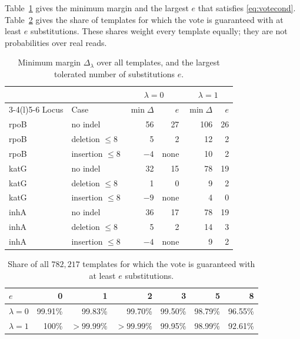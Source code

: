 \documentclass[11pt]{article}
\theoremstyle{plain}
\theoremstyle{definition}
\theoremstyle{remark}
\begin{document}
Table~\ref{tab:margins} gives the minimum margin and the largest $e$ that
satisfies \eqref{eq:votecond}. Table~\ref{tab:shares} gives the share of
templates for which the vote is guaranteed with at least $e$ substitutions.
These shares weight every template equally; they are not probabilities over real
reads.

\begin{table}[ht]
\centering
\caption{Minimum margin $\Delta_\lambda$ over all templates, and the largest
tolerated number of substitutions $e$.}\label{tab:margins}
\begin{tabular}{@{}llrrrr@{}}
\toprule
 & & \multicolumn{2}{c}{$\lambda = 0$} & \multicolumn{2}{c}{$\lambda = 1$} \\
\cmidrule(lr){3-4}\cmidrule(l){5-6}
Locus & Case & $\min\Delta$ & $e$ & $\min\Delta$ & $e$ \\
\midrule
rpoB & no indel            & 56   & 27   & 106 & 26 \\
rpoB & deletion $\le 8$    & 5    & 2    & 12  & 2  \\
rpoB & insertion $\le 8$   & $-4$ & none & 10  & 2  \\
katG & no indel            & 32   & 15   & 78  & 19 \\
katG & deletion $\le 8$    & 1    & 0    & 9   & 2  \\
katG & insertion $\le 8$   & $-9$ & none & 4   & 0  \\
inhA & no indel            & 36   & 17   & 78  & 19 \\
inhA & deletion $\le 8$    & 5    & 2    & 14  & 3  \\
inhA & insertion $\le 8$   & $-4$ & none & 9   & 2  \\
\bottomrule
\end{tabular}
\end{table}

\begin{table}[ht]
\centering
\caption{Share of all $782{,}217$ templates for which the vote is guaranteed
with at least $e$ substitutions.}\label{tab:shares}
\begin{tabular}{@{}lrrrrrr@{}}
\toprule
$e$ & 0 & 1 & 2 & 3 & 5 & 8 \\
\midrule
$\lambda = 0$ & 99.91\% & 99.83\% & 99.70\% & 99.50\% & 98.79\% & 96.55\% \\
$\lambda = 1$ & 100\%   & $>99.99\%$ & $>99.99\%$ & 99.95\% & 98.99\% & 92.61\% \\
\bottomrule
\end{tabular}
\end{table}
\end{document}

